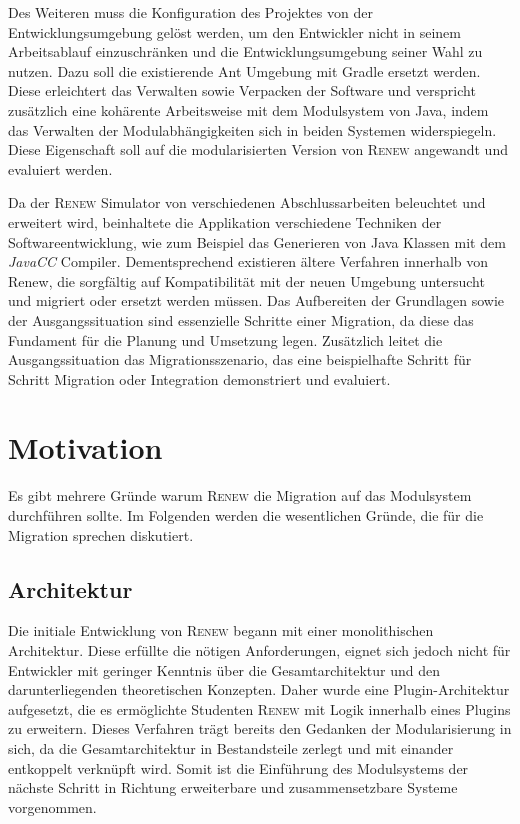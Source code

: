 	Des Weiteren muss die Konfiguration des Projektes von der Entwicklungsumgebung gelöst werden, um den Entwickler nicht in seinem Arbeitsablauf einzuschränken und die Entwicklungsumgebung seiner Wahl zu nutzen. Dazu soll die existierende Ant Umgebung mit Gradle ersetzt werden. Diese erleichtert das Verwalten sowie Verpacken der Software und verspricht zusätzlich eine kohärente Arbeitsweise mit dem Modulsystem von Java, indem das Verwalten der Modulabhängigkeiten sich in beiden Systemen widerspiegeln. Diese Eigenschaft soll auf die modularisierten Version von \textsc{Renew} angewandt und evaluiert werden. \bigbreak

	Da der \textsc{Renew} Simulator von verschiedenen Abschlussarbeiten beleuchtet und erweitert wird, beinhaltete die Applikation verschiedene Techniken der Softwareentwicklung, wie zum Beispiel das Generieren von Java Klassen mit dem \textit{JavaCC} Compiler. Dementsprechend existieren ältere Verfahren innerhalb von Renew, die sorgfältig auf Kompatibilität mit der neuen Umgebung untersucht und migriert oder ersetzt werden müssen. \bigbreak
	Das Aufbereiten der Grundlagen sowie der Ausgangssituation sind essenzielle Schritte einer Migration, da diese das Fundament für die Planung und Umsetzung legen. Zusätzlich leitet die Ausgangssituation das Migrationsszenario, das eine beispielhafte Schritt für Schritt Migration oder Integration demonstriert und evaluiert.\bigbreak

\section{Motivation}\label{sec:motivation}
	Es gibt mehrere Gründe warum \textsc{Renew} die Migration auf das Modulsystem durchführen sollte. Im Folgenden werden die wesentlichen Gründe, die für die Migration sprechen diskutiert.  

\subsection{Architektur} \label{sub:architektur}
	Die initiale Entwicklung von \textsc{Renew} begann mit einer monolithischen Architektur. Diese erfüllte die nötigen Anforderungen, eignet sich jedoch nicht für Entwickler mit geringer Kenntnis über die Gesamtarchitektur und den darunterliegenden theoretischen Konzepten. Daher wurde eine Plugin-Architektur aufgesetzt, die es ermöglichte Studenten \textsc{Renew} mit Logik innerhalb eines Plugins zu erweitern. Dieses Verfahren trägt bereits den Gedanken der Modularisierung in sich, da die Gesamtarchitektur in Bestandsteile zerlegt und mit einander entkoppelt verknüpft wird. Somit ist die Einführung des Modulsystems der nächste Schritt in Richtung erweiterbare und zusammensetzbare Systeme vorgenommen.

